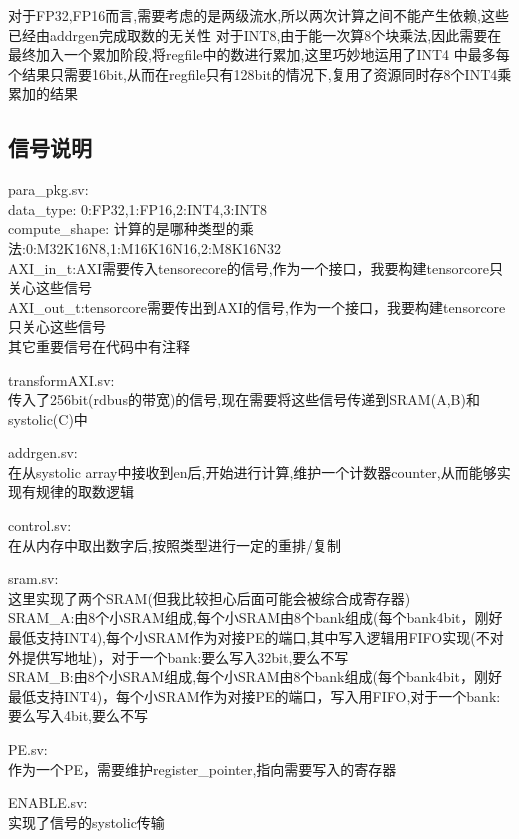\documentclass[zihao=-4, UTF8]{ctexart}
\begin{document}
对于FP32,FP16而言,需要考虑的是两级流水,所以两次计算之间不能产生依赖,这些已经由addrgen完成取数的无关性
对于INT8,由于能一次算8个块乘法,因此需要在最终加入一个累加阶段,将regfile中的数进行累加,这里巧妙地运用了INT4
中最多每个结果只需要16bit,从而在regfile只有128bit的情况下,复用了资源同时存8个INT4乘累加的结果

\subsection{信号说明}
para\_pkg.sv:\\
data\_type: 0:FP32,1:FP16,2:INT4,3:INT8\\
compute\_shape: 计算的是哪种类型的乘法:0:M32K16N8,1:M16K16N16,2:M8K16N32\\
AXI\_in\_t:AXI需要传入tensorecore的信号,作为一个接口，我要构建tensorcore只关心这些信号\\
AXI\_out\_t:tensorcore需要传出到AXI的信号,作为一个接口，我要构建tensorcore只关心这些信号\\
其它重要信号在代码中有注释

transformAXI.sv:\\
传入了256bit(rdbus的带宽)的信号,现在需要将这些信号传递到SRAM(A,B)和systolic(C)中

addrgen.sv:\\
在从systolic array中接收到en后,开始进行计算,维护一个计数器counter,从而能够实现有规律的取数逻辑

control.sv:\\
在从内存中取出数字后,按照类型进行一定的重排/复制

sram.sv:\\
这里实现了两个SRAM(但我比较担心后面可能会被综合成寄存器)\\
SRAM\_A:由8个小SRAM组成,每个小SRAM由8个bank组成(每个bank4bit，刚好最低支持INT4),每个小SRAM作为对接PE的端口,其中写入逻辑用FIFO实现(不对外提供写地址)，对于一个bank:要么写入32bit,要么不写\\
SRAM\_B:由8个小SRAM组成,每个小SRAM由8个bank组成(每个bank4bit，刚好最低支持INT4)，每个小SRAM作为对接PE的端口，写入用FIFO,对于一个bank:要么写入4bit,要么不写

PE.sv:\\
作为一个PE，需要维护register\_pointer,指向需要写入的寄存器

ENABLE.sv:\\
实现了信号的systolic传输
\end{document}
